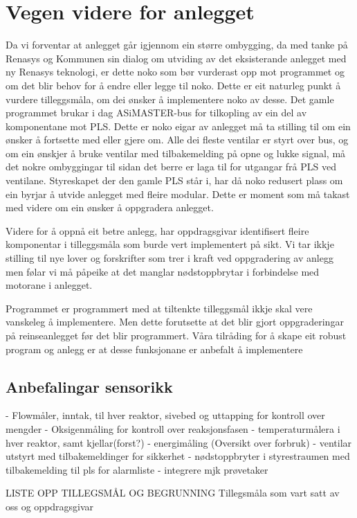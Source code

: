 \section{Vegen videre for anlegget}
\thispagestyle{fancy}



Da vi forventar at anlegget går igjennom ein større ombygging, da med tanke på Renasys og Kommunen sin dialog om utviding 
av det eksisterande anlegget med ny Renasys teknologi, er dette noko som bør vurderast opp mot programmet
 og om det blir behov for å endre eller legge til noko. 
Dette er eit naturleg punkt å vurdere tilleggsmåla, om dei ønsker å implementere noko av desse.
Det gamle programmet brukar i dag ASiMASTER-bus for tilkopling av ein del av komponentane mot PLS. 
Dette er noko eigar av anlegget må ta stilling til om ein ønsker å fortsette med eller gjere om. Alle dei fleste 
ventilar er styrt over bus, og om ein ønskjer å bruke ventilar med tilbakemelding på opne og lukke signal, 
må det nokre ombyggingar til sidan det berre er laga til for utgangar frå PLS ved ventilane.
Styreskapet der den gamle PLS står i, har då noko redusert plass om ein byrjar å utvide anlegget med fleire modular. 
Dette er moment som må takast med videre om ein ønsker å oppgradera anlegget.

Videre for å oppnå eit betre anlegg, har oppdragsgivar identifisert fleire komponentar i tilleggsmåla som burde 
vert implementert på sikt. Vi tar ikkje stilling til nye lover og forskrifter som trer i kraft ved oppgradering av anlegg
men følar vi må påpeike at det manglar nødstoppbrytar i forbindelse med motorane i anlegget.

Programmet er programmert med at tiltenkte tilleggsmål ikkje skal vere vanskeleg å implementere. 
Men dette forutsette at det blir gjort oppgraderingar på reinseanlegget før det blir programmert. 
Våra tilråding for å skape eit robust program og anlegg er at desse funksjonane er anbefalt å implementere

\subsection{Anbefalingar sensorikk}

- Flowmåler, inntak, til hver reaktor, sivebed og uttapping for kontroll over mengder
- Oksigenmåling for kontroll over reaksjonsfasen
- temperaturmålera i hver reaktor, samt kjellar(forst?)
- energimåling (Oversikt over forbruk)
- ventilar utstyrt med tilbakemeldinger for sikkerhet
- nødstoppbryter i styrestraumen med tilbakemelding til pls for alarmliste
- integrere mjk prøvetaker


LISTE OPP TILLEGSMÅL OG BEGRUNNING
Tillegsmåla som vart satt av oss og oppdragsgivar




\newpage


